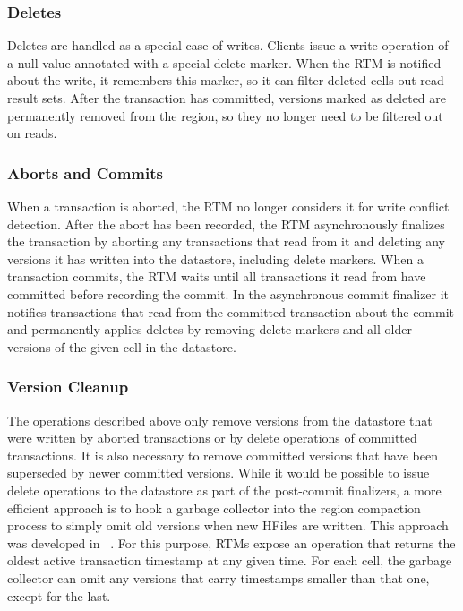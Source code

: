 \documentclass[10pt,final,journal]{IEEEtran}
\begin{document}
\subsubsection{Deletes}
Deletes are handled as a special case of writes. Clients issue a write operation of a null value annotated with a special delete marker. When the RTM is notified about the write, it remembers this marker, so it can filter deleted cells out read result sets. After the transaction has committed, versions marked as deleted are permanently removed from the region, so they no longer need to be filtered out on reads.

\subsubsection{Aborts and Commits}
When a transaction is aborted, the RTM no longer considers it for write conflict detection. After the abort has been recorded, the RTM asynchronously finalizes the transaction by aborting any transactions that read from it and deleting any versions it has written into the datastore, including delete markers. When a transaction commits, the RTM waits until all transactions it read from have committed before recording the commit. In the asynchronous commit finalizer it notifies transactions that read from the committed transaction about the commit and permanently applies deletes by removing delete markers and all older versions of the given cell in the datastore.

\subsubsection{Version Cleanup}
The operations described above only remove versions from the datastore that were written by aborted transactions or by delete operations of committed transactions. It is also necessary to remove committed versions that have been superseded by newer committed versions. While it would be possible to issue delete operations to the datastore as part of the post-commit finalizers, a more efficient approach is to hook a garbage collector into the region compaction process to simply omit old versions when new HFiles are written. This approach was developed in ~\cite{Junqueira:2011:LTS:2056318.2057148}. For this purpose, RTMs expose an operation that returns the oldest active transaction timestamp at any given time. For each cell, the garbage collector can omit any versions that carry timestamps smaller than that one, except for the last.
\end{document}
